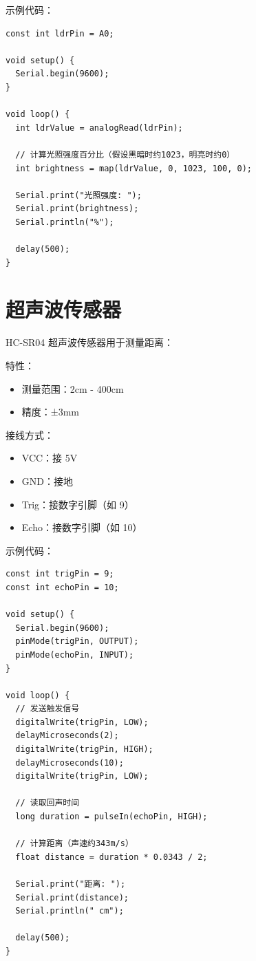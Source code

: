 \documentclass[12pt,UTF8]{ctexbook}
\begin{document}
示例代码：
\begin{lstlisting}
const int ldrPin = A0;

void setup() {
  Serial.begin(9600);
}

void loop() {
  int ldrValue = analogRead(ldrPin);
  
  // 计算光照强度百分比（假设黑暗时约1023，明亮时约0）
  int brightness = map(ldrValue, 0, 1023, 100, 0);
  
  Serial.print("光照强度: ");
  Serial.print(brightness);
  Serial.println("%");
  
  delay(500);
}
\end{lstlisting}

\section{超声波传感器}

HC-SR04 超声波传感器用于测量距离：

特性：
\begin{itemize}
    \item 测量范围：2cm - 400cm
    \item 精度：±3mm
\end{itemize}

接线方式：
\begin{itemize}
    \item VCC：接 5V
    \item GND：接地
    \item Trig：接数字引脚（如 9）
    \item Echo：接数字引脚（如 10）
\end{itemize}

示例代码：
\begin{lstlisting}
const int trigPin = 9;
const int echoPin = 10;

void setup() {
  Serial.begin(9600);
  pinMode(trigPin, OUTPUT);
  pinMode(echoPin, INPUT);
}

void loop() {
  // 发送触发信号
  digitalWrite(trigPin, LOW);
  delayMicroseconds(2);
  digitalWrite(trigPin, HIGH);
  delayMicroseconds(10);
  digitalWrite(trigPin, LOW);
  
  // 读取回声时间
  long duration = pulseIn(echoPin, HIGH);
  
  // 计算距离（声速约343m/s）
  float distance = duration * 0.0343 / 2;
  
  Serial.print("距离: ");
  Serial.print(distance);
  Serial.println(" cm");
  
  delay(500);
}
\end{lstlisting}
\end{document}

